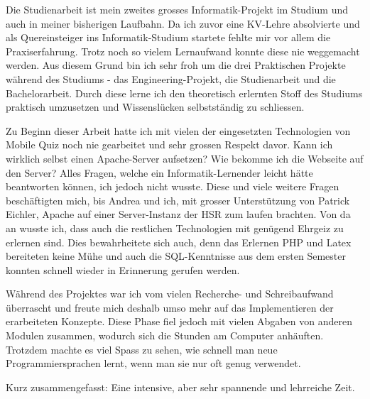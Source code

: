 
Die Studienarbeit ist mein zweites grosses Informatik-Projekt im Studium und auch in meiner bisherigen Laufbahn. Da ich zuvor eine KV-Lehre absolvierte und als Quereinsteiger ins Informatik-Studium startete fehlte mir vor allem die Praxiserfahrung. Trotz noch so vielem Lernaufwand konnte diese nie weggemacht werden. Aus diesem Grund bin ich sehr froh um die drei Praktischen Projekte während des Studiums - das Engineering-Projekt, die Studienarbeit und die Bachelorarbeit. Durch diese lerne ich den theoretisch erlernten Stoff des Studiums praktisch umzusetzen und Wissenslücken selbstständig zu schliessen.

\bigskip

Zu Beginn dieser Arbeit hatte ich mit vielen der eingesetzten Technologien von Mobile Quiz noch nie gearbeitet und sehr grossen Respekt davor. Kann ich wirklich selbst einen Apache-Server aufsetzen? Wie bekomme ich die Webseite auf den Server? Alles Fragen, welche ein Informatik-Lernender leicht hätte beantworten können, ich jedoch nicht wusste.
Diese und viele weitere Fragen beschäftigten mich, bis Andrea und ich, mit grosser Unterstützung von Patrick Eichler, Apache auf einer Server-Instanz der HSR zum laufen brachten. Von da an wusste ich, dass auch die restlichen Technologien mit genügend Ehrgeiz zu erlernen sind. Dies bewahrheitete sich auch, denn das Erlernen PHP und Latex bereiteten keine Mühe und auch die SQL-Kenntnisse aus dem ersten Semester konnten schnell wieder in Erinnerung gerufen werden.

\bigskip

Während des Projektes war ich vom vielen Recherche- und Schreibaufwand überrascht und freute mich deshalb umso mehr auf das Implementieren der erarbeiteten Konzepte. Diese Phase fiel jedoch mit vielen Abgaben von anderen Modulen zusammen, wodurch sich die Stunden am Computer anhäuften. Trotzdem machte es viel Spass zu sehen, wie schnell man neue Programmiersprachen lernt, wenn man sie nur oft genug verwendet.

\bigskip

Kurz zusammengefasst: Eine intensive, aber sehr spannende und lehrreiche Zeit.